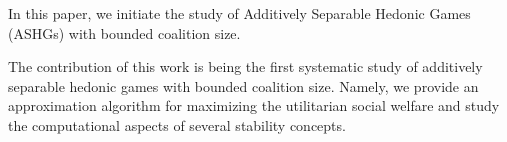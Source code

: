 \documentclass[sigconf]{aamas}
\begin{document}
In this paper, we initiate the study of Additively Separable Hedonic Games (ASHGs) \cite{bogomolnaia2002stability} with bounded coalition size. %

%
The contribution of this work is being the first systematic study of additively separable hedonic games with bounded coalition size. Namely, we provide an approximation algorithm for maximizing the utilitarian social welfare and study the computational aspects of several stability concepts.
\end{document}
